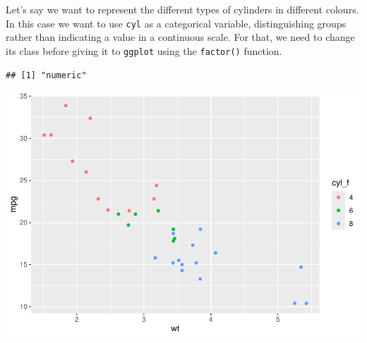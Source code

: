 \documentclass[
]{article}
\newenvironment{Shaded}{\begin{snugshade}}{\end{snugshade}}
\newcommand{\AttributeTok}[1]{\textcolor[rgb]{0.13,0.29,0.53}{#1}}
\newcommand{\CommentTok}[1]{\textcolor[rgb]{0.56,0.35,0.01}{\textit{#1}}}
\newcommand{\FunctionTok}[1]{\textcolor[rgb]{0.13,0.29,0.53}{\textbf{#1}}}
\newcommand{\NormalTok}[1]{#1}
\newcommand{\OtherTok}[1]{\textcolor[rgb]{0.56,0.35,0.01}{#1}}
\newcommand{\SpecialCharTok}[1]{\textcolor[rgb]{0.81,0.36,0.00}{\textbf{#1}}}
\begin{document}
Let's say we want to represent the different types of cylinders in
different colours. In this case we want to use \texttt{cyl} as a
categorical variable, distinguishing groups rather than indicating a
value in a continuous scale. For that, we need to change its class
before giving it to \texttt{ggplot} using the \texttt{factor()}
function.

\begin{Shaded}
\end{Shaded}

\begin{verbatim}
## [1] "numeric"
\end{verbatim}

\begin{Shaded}
\end{Shaded}

\begin{center}\includegraphics{P1_exercises_files/figure-latex/groups-ggplot2-1} \end{center}
\end{document}
